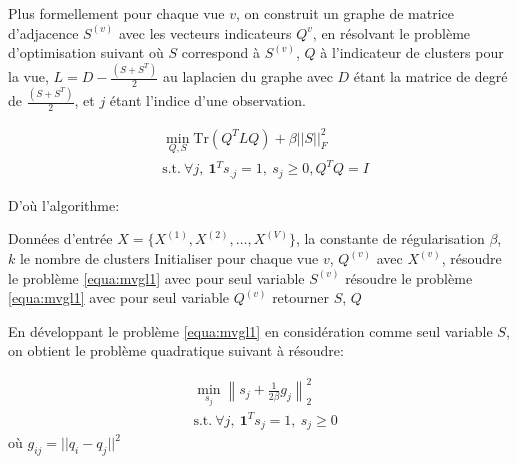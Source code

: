   	 
           Plus formellement pour chaque vue $v$, on construit un graphe de matrice d'adjacence $S^{(v)}$ avec les vecteurs indicateurs $Q^v$, en résolvant le problème d'optimisation suivant où $S$ correspond à $S^{(v)}$, $Q$ à l'indicateur de clusters pour la vue, $L = D - \frac{(S + S^T)}{2}$ au laplacien du graphe avec $D$ étant la matrice de degré de $\frac{(S + S^T)}{2}$,
  	  et $j$ étant l'indice d'une observation.
    
           \begin{equation}
			\begin{aligned}
				& \min_{Q,S} \text{Tr}(Q^TLQ) + \beta{||S||}_F^2
     		   \\ & \text{s.t.}\ \forall j,\ \textbf{1}^Ts_{.j} = 1,\ s_j\geq0 , Q^TQ = I
     	   \end{aligned}
			\label{equa:mvgl1}
  	  \end{equation}
    
  	  D'où l'algorithme:
  	  \begin{algorithm}[H]
      		 \caption{Algorithme d'apprentissage des graphes des vues \cite{zhan2017graph}}
      		 \label{alg:mvgl1}
      		 \begin{algorithmic}[1]
      		 \REQUIRE Données d'entrée $X = \{ X^{(1)}, X^{(2)},\dots,X^{(V)} \}$, la constante de régularisation $\beta$, $k$ le nombre de clusters
     		 \STATE Initialiser pour chaque vue $v$, $Q^{(v)}$ avec $X^{(v)}$,
     	 		 \REPEAT
					\STATE résoudre le problème \ref{equa:mvgl1} avec pour seul variable $S^{(v)}$
           		 \STATE résoudre le problème \ref{equa:mvgl1} avec pour seul variable $Q^{(v)}$
			\ENDFOR
   		 \STATE retourner $S$, $Q$
   		 \end{algorithmic}
   	 \end{algorithm}

		 En développant le problème \ref{equa:mvgl1} en considération comme seul variable $S$, on obtient le problème quadratique suivant à résoudre:
   	 
		 \begin{equation}
			\begin{aligned}
				& \min_{s_j} {\left\| s_{j} + \frac{1}{2\beta}g_j \right\|}_2^2
     		   \\ & \text{s.t.}\ \forall j,\ \textbf{1}^Ts_{j} = 1,\ s_{j}\geq0
     	   \end{aligned}
  	  \end{equation}
		 où $g_{ij} = {|| q_i - q_j ||}^2$
   	 
